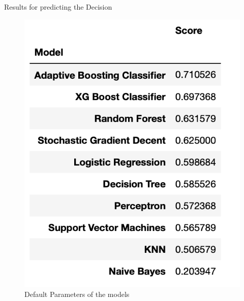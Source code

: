 \documentclass[11pt]{beamer}
\begin{document}
\begin{frame}{Results for predicting the Decision}
	
\begin{figure}
	\centering
	\begin{minipage}{0.49\textwidth}
		\centering
		\includegraphics[width=1\textwidth]{Table1Decision} %
		\caption{Default Parameters of the models}
	\end{minipage}\hfill
	\begin{minipage}{0.49\textwidth}
		\centering

\end{minipage}
\end{figure}
\end{frame}
\end{document}
